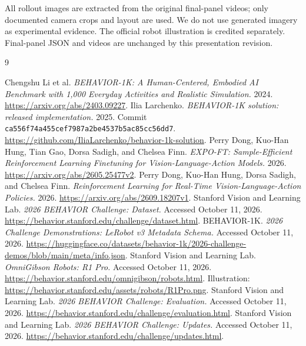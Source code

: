 \documentclass[11pt]{article}
\begin{document}
All rollout images are extracted from the original final-panel videos; only documented camera crops and layout are used. We do not use generated imagery as experimental evidence. The official robot illustration is credited separately. Final-panel JSON and videos are unchanged by this presentation revision.

\begingroup\small\setlength{\parskip}{2pt}
\begin{thebibliography}{9}\raggedright
{} Chengshu Li et al. \emph{BEHAVIOR-1K: A Human-Centered, Embodied AI Benchmark with 1,000 Everyday Activities and Realistic Simulation.} 2024. \url{https://arxiv.org/abs/2403.09227}.
 Ilia Larchenko. \emph{BEHAVIOR-1K solution: released implementation.} 2025. Commit \texttt{ca556f74a455cef7987a2be4537b5ac85cc56dd7}. \url{https://github.com/IliaLarchenko/behavior-1k-solution}.
 Perry Dong, Kuo-Han Hung, Tian Gao, Dorsa Sadigh, and Chelsea Finn. \emph{EXPO-FT: Sample-Efficient Reinforcement Learning Finetuning for Vision-Language-Action Models.} 2026. \url{https://arxiv.org/abs/2605.25477v2}.
 Perry Dong, Kuo-Han Hung, Dorsa Sadigh, and Chelsea Finn. \emph{Reinforcement Learning for Real-Time Vision-Language-Action Policies.} 2026. \url{https://arxiv.org/abs/2609.18207v1}.
 Stanford Vision and Learning Lab. \emph{2026 BEHAVIOR Challenge: Dataset.} Accessed October 11, 2026. \url{https://behavior.stanford.edu/challenge/dataset.html}.
 BEHAVIOR-1K. \emph{2026 Challenge Demonstrations: LeRobot v3 Metadata Schema.} Accessed October 11, 2026. \url{https://huggingface.co/datasets/behavior-1k/2026-challenge-demos/blob/main/meta/info.json}.
 Stanford Vision and Learning Lab. \emph{OmniGibson Robots: R1 Pro.} Accessed October 11, 2026. \url{https://behavior.stanford.edu/omnigibson/robots.html}. Illustration: \url{https://behavior.stanford.edu/assets/robots/R1Pro.png}.
 Stanford Vision and Learning Lab. \emph{2026 BEHAVIOR Challenge: Evaluation.} Accessed October 11, 2026. \url{https://behavior.stanford.edu/challenge/evaluation.html}.
 Stanford Vision and Learning Lab. \emph{2026 BEHAVIOR Challenge: Updates.} Accessed October 11, 2026. \url{https://behavior.stanford.edu/challenge/updates.html}.
\end{thebibliography}\endgroup
\end{document}

